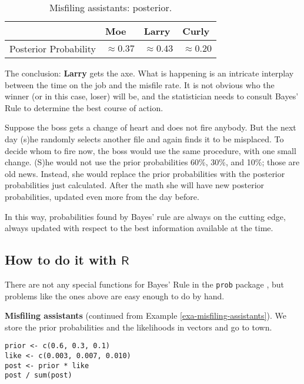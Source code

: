 \begin{table}[htb]
\caption[Misfiling assistants: posterior]{Misfiling assistants: posterior.}
\centering
\begin{tabular}{llll}
 & Moe & Larry & Curly\\
\hline
Posterior Probability & \(\approx0.37\) & \(\approx0.43\) & \(\approx0.20\)\\
\end{tabular}
\end{table}

The conclusion: \textbf{Larry} gets the axe. What is happening is an
intricate interplay between the time on the job and the misfile
rate. It is not obvious who the winner (or in this case, loser) will
be, and the statistician needs to consult Bayes' Rule to determine the
best course of action.


\label{exa-misfiling-assistants-multiple} Suppose the boss gets a change
of heart and does not fire anybody. But the next day (s)he randomly
selects another file and again finds it to be misplaced. To decide
whom to fire now, the boss would use the same procedure, with one
small change. (S)he would not use the prior probabilities 60\%, 30\%,
and 10\%; those are old news. Instead, she would replace the prior
probabilities with the posterior probabilities just calculated. After
the math she will have new posterior probabilities, updated even more
from the day before.

In this way, probabilities found by Bayes' rule are always on the
cutting edge, always updated with respect to the best information
available at the time.

\subsection{How to do it with \(\mathsf{R}\)}
\label{sec-4-8-1}

There are not any special functions for Bayes' Rule in the \texttt{prob}
package \cite{prob}, but problems like the ones above are easy enough
to do by hand.


\textbf{Misfiling assistants} (continued from Example \ref{exa-misfiling-assistants}). We store the prior probabilities and the likelihoods in
vectors and go to town.

\begin{verbatim}
prior <- c(0.6, 0.3, 0.1)
like <- c(0.003, 0.007, 0.010)
post <- prior * like
post / sum(post)
\end{verbatim}

